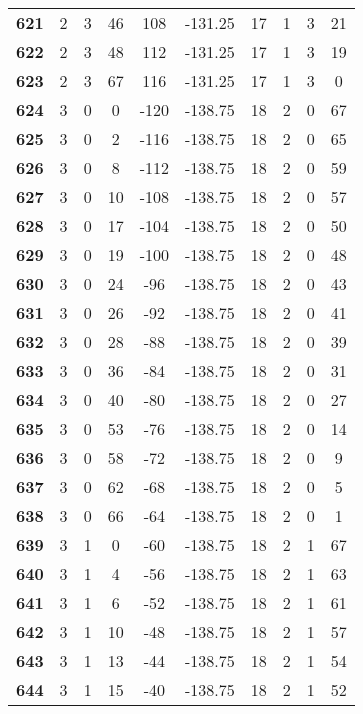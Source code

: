 \documentclass{article}%
\begin{document}
\begin{longtable}{cccccccccc}
        \textbf{621} & 2 & 3 & 46 & 108 & -131.25 & 17 & 1 & 3 & 21 \\ 
        \textbf{622} & 2 & 3 & 48 & 112 & -131.25 & 17 & 1 & 3 & 19 \\ 
        \textbf{623} & 2 & 3 & 67 & 116 & -131.25 & 17 & 1 & 3 & 0 \\ 
        \textbf{624} & 3 & 0 & 0 & -120 & -138.75 & 18 & 2 & 0 & 67 \\ 
        \textbf{625} & 3 & 0 & 2 & -116 & -138.75 & 18 & 2 & 0 & 65 \\ 
        \textbf{626} & 3 & 0 & 8 & -112 & -138.75 & 18 & 2 & 0 & 59 \\ 
        \textbf{627} & 3 & 0 & 10 & -108 & -138.75 & 18 & 2 & 0 & 57 \\ 
        \textbf{628} & 3 & 0 & 17 & -104 & -138.75 & 18 & 2 & 0 & 50 \\ 
        \textbf{629} & 3 & 0 & 19 & -100 & -138.75 & 18 & 2 & 0 & 48 \\ 
        \textbf{630} & 3 & 0 & 24 & -96 & -138.75 & 18 & 2 & 0 & 43 \\ 
        \textbf{631} & 3 & 0 & 26 & -92 & -138.75 & 18 & 2 & 0 & 41 \\ 
        \textbf{632} & 3 & 0 & 28 & -88 & -138.75 & 18 & 2 & 0 & 39 \\ 
        \textbf{633} & 3 & 0 & 36 & -84 & -138.75 & 18 & 2 & 0 & 31 \\ 
        \textbf{634} & 3 & 0 & 40 & -80 & -138.75 & 18 & 2 & 0 & 27 \\ 
        \textbf{635} & 3 & 0 & 53 & -76 & -138.75 & 18 & 2 & 0 & 14 \\ 
        \textbf{636} & 3 & 0 & 58 & -72 & -138.75 & 18 & 2 & 0 & 9 \\ 
        \textbf{637} & 3 & 0 & 62 & -68 & -138.75 & 18 & 2 & 0 & 5 \\ 
        \textbf{638} & 3 & 0 & 66 & -64 & -138.75 & 18 & 2 & 0 & 1 \\ 
        \textbf{639} & 3 & 1 & 0 & -60 & -138.75 & 18 & 2 & 1 & 67 \\ 
        \textbf{640} & 3 & 1 & 4 & -56 & -138.75 & 18 & 2 & 1 & 63 \\ 
        \textbf{641} & 3 & 1 & 6 & -52 & -138.75 & 18 & 2 & 1 & 61 \\ 
        \textbf{642} & 3 & 1 & 10 & -48 & -138.75 & 18 & 2 & 1 & 57 \\ 
        \textbf{643} & 3 & 1 & 13 & -44 & -138.75 & 18 & 2 & 1 & 54 \\ 
        \textbf{644} & 3 & 1 & 15 & -40 & -138.75 & 18 & 2 & 1 & 52 \\ 

\end{longtable}
\end{document}
